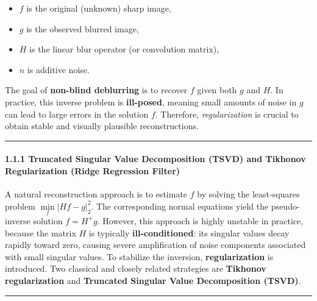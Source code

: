 \documentclass[11pt]{article}
\providecommand{\tightlist}{%
      \setlength{\itemsep}{0pt}\setlength{\parskip}{0pt}}
\begin{document}
\begin{itemize}
\tightlist
\item
  \(f\) is the original (unknown) sharp image,
\item
  \(g\) is the observed blurred image,
\item
  \(H\) is the linear blur operator (or convolution matrix),
\item
  \(n\) is additive noise.
\end{itemize}

The goal of \textbf{non-blind deblurring} is to recover \(f\) given both
\(g\) and \(H\). In practice, this inverse problem is
\textbf{ill-posed}, meaning small amounts of noise in \(g\) can lead to
large errors in the solution \(f\). Therefore, \emph{regularization} is
crucial to obtain stable and visually plausible reconstructions.

\begin{center}\rule{0.5\linewidth}{0.5pt}\end{center}

\hypertarget{truncated-singular-value-decomposition-tsvd-and-tikhonov-regularization-ridge-regression-filter}{%
\paragraph{\texorpdfstring{\textbf{1.1.1 Truncated Singular Value
Decomposition (TSVD) and Tikhonov Regularization (Ridge Regression
Filter)}}{1.1.1 Truncated Singular Value Decomposition (TSVD) and Tikhonov Regularization (Ridge Regression Filter)}}\label{truncated-singular-value-decomposition-tsvd-and-tikhonov-regularization-ridge-regression-filter}}

A natural reconstruction approach is to estimate \(f\) by solving the
least-squares problem \(\underset{f}{\min}|Hf - g|_2^2\). The
corresponding normal equations yield the pseudo-inverse solution
\(f = H^{+} g\). However, this approach is highly unstable in practice,
because the matrix \(H\) is typically \textbf{ill-conditioned}: its
singular values decay rapidly toward zero, causing severe amplification
of noise components associated with small singular values. To stabilize
the inversion, \textbf{regularization} is introduced. Two classical and
closely related strategies are \textbf{Tikhonov regularization} and
\textbf{Truncated Singular Value Decomposition (TSVD)}.

\begin{center}\rule{0.5\linewidth}{0.5pt}\end{center}
\end{document}
